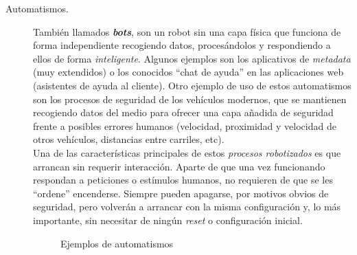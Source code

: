 \begin{description}
	\item [Automatismos.] También llamados \textit{\textbf{bots}}, son un robot sin una capa física que funciona de forma independiente recogiendo datos, procesándolos y respondiendo a ellos de forma \textit{inteligente}. Algunos ejemplos son los aplicativos de \textit{metadata} (muy extendidos) o los conocidos ``chat de ayuda'' en las aplicaciones web (asistentes de ayuda al cliente). Otro ejemplo de uso de estos automatismos son los procesos de seguridad de los vehículos modernos, que se mantienen recogiendo datos del medio  para ofrecer una capa añadida de seguridad frente a posibles errores humanos (velocidad, proximidad y velocidad de otros vehículos, distancias entre carriles, etc).\\
	Una de las características principales de estos \textit{procesos robotizados} es que arrancan sin requerir interacción. Aparte de que una vez funcionando respondan a peticiones o estímulos humanos, no requieren de que se les ``ordene'' encenderse. Siempre pueden apagarse, por motivos obvios de seguridad, pero volverán a arrancar con la misma configuración y, lo más importante, sin necesitar de ningún \textit{reset} o configuración inicial.
	
	\begin{figure}[h]
		\centering
		\begin{subfigure}
			[Seguridad robotizada en un coche]{
			\texttt{[image: coche.jpg]}
			\label{img:coche}
		}
		\end{subfigure}
	\begin{subfigure}
		[Chatbot de ayuda comercial]{
			\texttt{[image: chatbot.jpg]}
			\label{img:chatbot}
		}
	\end{subfigure}
	\caption{Ejemplos de automatismos}
	\label{img:bots}
	\end{figure}


\end{description}
